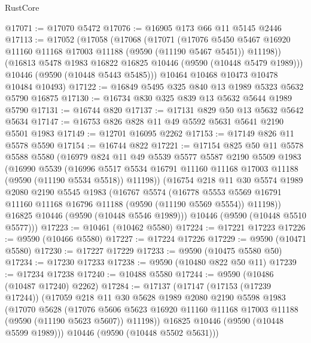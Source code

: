 \begin{lexlean}{RustCore}
\begin{coremodule}
@17071 := @17070 @5472
@17076 := @16905 @173 @66 @11 @5145 @2446
@17113 := @17052
    (@17058
      (@17068
        (@17071
          (@17076
            @5450
            @5467
            @16920
            @11160
            @11168
            @17003
            @11188
            (@9590 (@11190 @5467 @5451))
            @11198))
        (@16813 @5478 @1983 @16822 @16825 @10446 (@9590 (@10448 @5479 @1989)))
        @10446
        (@9590 (@10448 @5443 @5485)))
      @10464
      @10468
      @10473
      @10478
      @10484
      @10493)
@17122 := @16849 @5495 @325 @840 @13 @1989 @5323 @5632 @5790 @16875
@17130 := @16734 @830 @325 @839 @13 @5632 @5644 @1989 @5790
@17131 := @16744 @820
@17137 := @17131 @829 @50 @13 @5632 @5642 @5634
@17147 := @16753 @826 @828 @11 @49 @5592 @5631 @5641 @2190 @5501 @1983
@17149 := @12701 @16095 @2262
@17153 := @17149 @826 @11 @5578 @5590
@17154 := @16744 @822
@17221 := @17154
    @825
    @50
    @11
    @5578
    @5588
    @5580
    (@16979
      @824
      @11
      @49
      @5539
      @5577
      @5587
      @2190
      @5509
      @1983
      (@16990
        @5539
        (@16996 @5517 @5534 @16791 @11160 @11168 @17003 @11188 (@9590 (@11190 @5534 @5518)) @11198))
      (@16754
        @218
        @11
        @30
        @5574
        @1989
        @2080
        @2190
        @5545
        @1983
        (@16767
          @5574
          (@16778
            @5553
            @5569
            @16791
            @11160
            @11168
            @16796
            @11188
            (@9590 (@11190 @5569 @5554))
            @11198))
        @16825
        @10446
        (@9590 (@10448 @5546 @1989)))
      @10446
      (@9590 (@10448 @5510 @5577)))
@17223 := @10461 (@10462 @5580)
@17224 := @17221 @17223
@17226 := @9590 (@10466 @5580)
@17227 := @17224 @17226
@17229 := @9590 (@10471 @5580)
@17230 := @17227 @17229
@17233 := @9590 (@10475 @5580 @50)
@17234 := @17230 @17233
@17238 := @9590 (@10480 @822 @50 @11)
@17239 := @17234 @17238
@17240 := @10488 @5580
@17244 := @9590 (@10486 (@10487 @17240) @2262)
@17284 := @17137
    (@17147
      (@17153 (@17239 @17244))
      (@17059
        @218
        @11
        @30
        @5628
        @1989
        @2080
        @2190
        @5598
        @1983
        (@17070
          @5628
          (@17076
            @5606
            @5623
            @16920
            @11160
            @11168
            @17003
            @11188
            (@9590 (@11190 @5623 @5607))
            @11198))
        @16825
        @10446
        (@9590 (@10448 @5599 @1989)))
      @10446
      (@9590 (@10448 @5502 @5631)))

\end{coremodule}
\end{lexlean}
